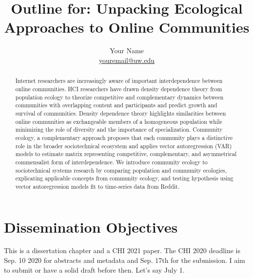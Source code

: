 \documentclass[12pt]{memoir}
\begin{document}
\setlength{\parskip}{4.5pt}

\baselineskip 16pt

\title{Outline for: Unpacking Ecological Approaches to Online Communities }
\author{Your Name\\
        \href{mailto:youremail@uw.edu}{youremail@uw.edu}}
\date{}

\published{\textsc{\textcolor{BrickRed}{This document is an
  unpublished draft.\\ Please do not distribute or cite without
  permission.}}}

\maketitle

\begin{abstract}
Internet researchers are increasingly aware of important interdependence between online communities.  HCI researchers have drawn density dependence theory from population ecology to theorize competitive and complementary dynamics between communities with overlapping content and participants and predict growth and survival of communities.   Density dependence theory highlights similarities between online communities as exchangeable members of a homogeneous population while minimizing the role of diversity and the importance of specialization.   Community ecology, a complementary approach proposes that each community plays a distinctive role in the broader sociotechnical ecosystem and applies vector autoregression (VAR) models to estimate matrix representing competitive, complementary, and asymmetrical commensalist form of interdependence.  We introduce community ecology to sociotechnical systems research by comparing population and community ecologies, explicating applicable concepts from community ecology, and testing hypothesis using vector autoregression models fit to time-series data from Reddit.
\end{abstract}

\section{Dissemination Objectives}

This is a dissertation chapter and a CHI 2021 paper. The CHI 2020 deadline is Sep. 10 2020 for abstracts and metadata and Sep. 17th for the submission. I aim to submit or have a solid draft before then. Let's say July 1. 
\end{document}
